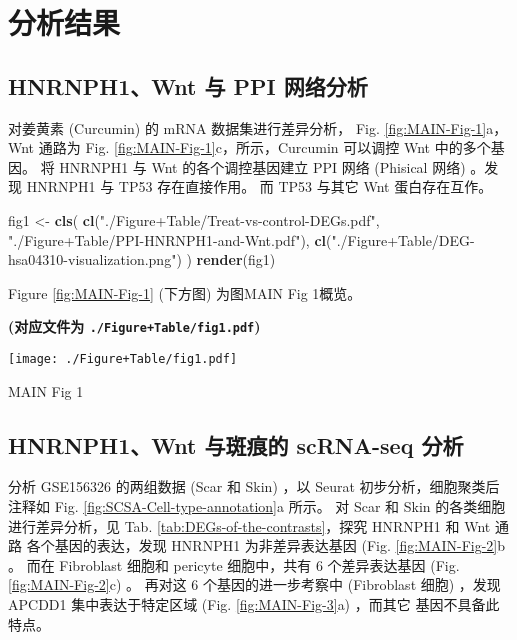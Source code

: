 \documentclass[
]{article}
\newenvironment{Shaded}{\begin{snugshade}}{\end{snugshade}}
\newcommand{\KeywordTok}[1]{\textcolor[rgb]{0.13,0.29,0.53}{\textbf{#1}}}
\newcommand{\NormalTok}[1]{#1}
\newcommand{\StringTok}[1]{\textcolor[rgb]{0.31,0.60,0.02}{#1}}
\begin{document}
\hypertarget{results}{%
\section{分析结果}\label{results}}

\hypertarget{hnrnph1wnt-ux4e0e-ppi-ux7f51ux7edcux5206ux6790}{%
\subsection{HNRNPH1、Wnt 与 PPI 网络分析}\label{hnrnph1wnt-ux4e0e-ppi-ux7f51ux7edcux5206ux6790}}

对姜黄素 (Curcumin) 的 mRNA 数据集进行差异分析， Fig. \ref{fig:MAIN-Fig-1}a，
Wnt 通路为 Fig. \ref{fig:MAIN-Fig-1}c，所示，Curcumin 可以调控 Wnt 中的多个基因。
将 HNRNPH1 与 Wnt 的各个调控基因建立 PPI 网络 (Phisical 网络) 。发现 HNRNPH1 与 TP53 存在直接作用。
而 TP53 与其它 Wnt 蛋白存在互作。

\begin{Shaded}
\begin{Highlighting}[]
\NormalTok{fig1 \textless{}{-}}\StringTok{ }\KeywordTok{cls}\NormalTok{(}
  \KeywordTok{cl}\NormalTok{(}\StringTok{"./Figure+Table/Treat{-}vs{-}control{-}DEGs.pdf"}\NormalTok{,}
    \StringTok{"./Figure+Table/PPI{-}HNRNPH1{-}and{-}Wnt.pdf"}\NormalTok{),}
  \KeywordTok{cl}\NormalTok{(}\StringTok{"./Figure+Table/DEG{-}hsa04310{-}visualization.png"}\NormalTok{)}
\NormalTok{)}
\KeywordTok{render}\NormalTok{(fig1)}
\end{Highlighting}
\end{Shaded}

Figure \ref{fig:MAIN-Fig-1} (下方图) 为图MAIN Fig 1概览。

\textbf{(对应文件为 \texttt{./Figure+Table/fig1.pdf})}

\def\@captype{figure}
\begin{center}
\texttt{[image: ./Figure+Table/fig1.pdf]}
\caption{MAIN Fig 1}\label{fig:MAIN-Fig-1}
\end{center}

\hypertarget{hnrnph1wnt-ux4e0eux6591ux75d5ux7684-scrna-seq-ux5206ux6790}{%
\subsection{HNRNPH1、Wnt 与斑痕的 scRNA-seq 分析}\label{hnrnph1wnt-ux4e0eux6591ux75d5ux7684-scrna-seq-ux5206ux6790}}

分析 GSE156326 的两组数据 (Scar 和 Skin) ，以 Seurat 初步分析，细胞聚类后注释如 Fig. \ref{fig:SCSA-Cell-type-annotation}a 所示。
对 Scar 和 Skin 的各类细胞进行差异分析，见 Tab. \ref{tab:DEGs-of-the-contrasts}，探究 HNRNPH1 和 Wnt 通路
各个基因的表达，发现 HNRNPH1 为非差异表达基因 (Fig. \ref{fig:MAIN-Fig-2}b 。
而在 Fibroblast 细胞和 pericyte 细胞中，共有 6 个差异表达基因 (Fig. \ref{fig:MAIN-Fig-2}c) 。
再对这 6 个基因的进一步考察中 (Fibroblast 细胞) ，发现 APCDD1 集中表达于特定区域 (Fig. \ref{fig:MAIN-Fig-3}a) ，而其它
基因不具备此特点。
\end{document}
